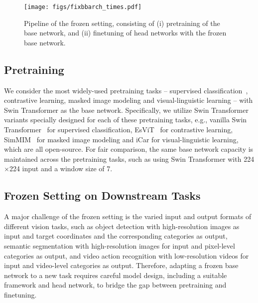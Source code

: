 \documentclass{article}
\begin{document}
\begin{figure}
    \centering
    \texttt{[image: figs/fixbbarch\_times.pdf]}
    \caption{Pipeline of the frozen setting, consisting of (i) pretraining of the base network, and (ii) finetuning of head networks with the frozen base network.}
    \label{fig:arch}
\end{figure}

\subsection{Pretraining}

We consider the most widely-used pretraining tasks -- supervised classification~\cite{liu2021swin,swinv2}, contrastive learning, masked image modeling and visual-linguistic learning -- with Swin Transformer as the base network. Specifically, we utilize Swin Transformer variants specially designed for each of these pretraining tasks, e.g., vanilla Swin Transformer~\cite{liu2021swin,swinv2} for supervised classification, EsViT~\cite{esvit} for contrastive learning, SimMIM~\cite{xie2021simmim} for masked image modeling and iCar\cite{yixuan2022icar} for visual-linguistic learning, which are all open-source.
For fair comparison, the same base network capacity is maintained across the pretraining tasks, such as using Swin Transformer with 224$\times$224 input and a window size of 7.

\subsection{Frozen Setting on Downstream Tasks} 
A major challenge of the frozen setting is the varied input and output formats of different vision tasks, such as object detection with high-resolution images as input and target coordinates and the corresponding categories as output, semantic segmentation with high-resolution images for input and pixel-level categories as output, and video action recognition with low-resolution videos for input and video-level categories as output. 
Therefore, adapting a frozen base network to a new task requires careful model design, including a suitable framework and head network, to bridge the gap between pretraining and finetuning.
\end{document}
